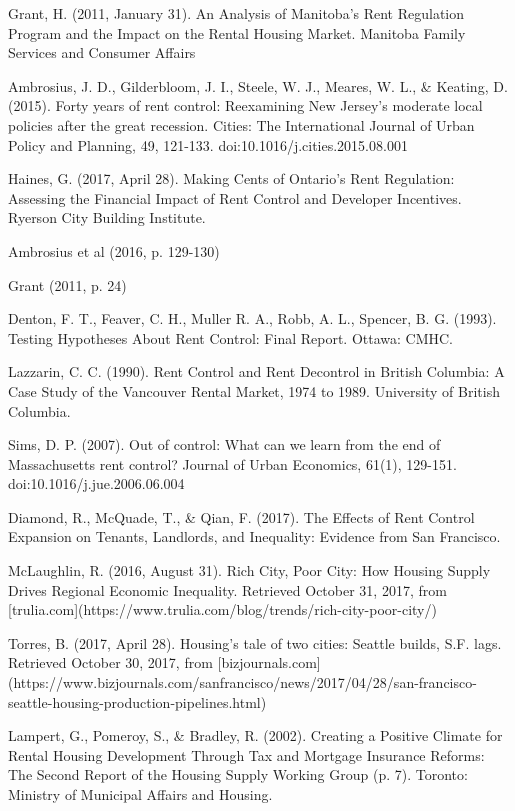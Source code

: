 \begin{thebibliography}{9}
  Grant, H. (2011, January 31). An Analysis of Manitoba’s Rent Regulation Program and the Impact on the Rental Housing Market. Manitoba Family Services and Consumer Affairs

   Ambrosius, J. D., Gilderbloom, J. I., Steele, W. J., Meares, W. L., \& Keating, D. (2015). Forty years of rent control: Reexamining New Jersey’s moderate local policies after the great recession. Cities: The International Journal of Urban Policy and Planning, 49, 121-133. doi:10.1016/j.cities.2015.08.001

  Haines, G. (2017, April 28). Making Cents of Ontario’s Rent Regulation: Assessing the Financial Impact of Rent Control and Developer Incentives. Ryerson City Building Institute.

  Ambrosius et al (2016, p. 129-130)

  Grant (2011, p. 24)

  Denton, F. T., Feaver, C. H., Muller R. A., Robb, A. L., Spencer, B. G. (1993). Testing Hypotheses About Rent Control: Final Report. Ottawa: CMHC.

  Lazzarin, C. C. (1990). Rent Control and Rent Decontrol in British Columbia: A Case Study of the Vancouver Rental Market, 1974 to 1989. University of British Columbia.

  Sims, D. P. (2007). Out of control: What can we learn from the end of Massachusetts rent control? Journal of Urban Economics, 61(1), 129-151. doi:10.1016/j.jue.2006.06.004

   Diamond, R., McQuade, T., \& Qian, F. (2017). The Effects of Rent Control Expansion on Tenants, Landlords, and Inequality: Evidence from San Francisco.

  McLaughlin, R. (2016, August 31). Rich City, Poor City: How Housing Supply Drives Regional Economic Inequality. Retrieved October 31, 2017, from [trulia.com](https://www.trulia.com/blog/trends/rich-city-poor-city/)

   Torres, B. (2017, April 28). Housing’s tale of two cities: Seattle builds, S.F. lags. Retrieved October 30, 2017, from [bizjournals.com](https://www.bizjournals.com/sanfrancisco/news/2017/04/28/san-francisco-seattle-housing-production-pipelines.html)

  Lampert, G., Pomeroy, S., \& Bradley, R. (2002). Creating a Positive Climate for Rental Housing Development Through Tax and Mortgage Insurance Reforms: The Second Report of the Housing Supply Working Group (p. 7). Toronto: Ministry of Municipal Affairs and Housing.


\end{thebibliography}
